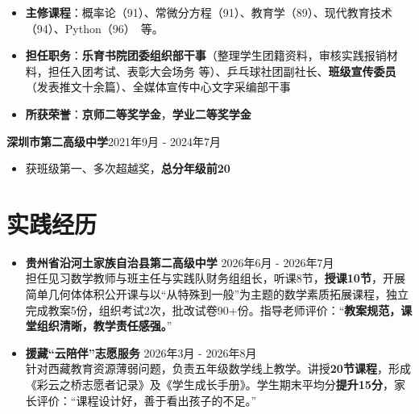 	\begin{itemize}
		
		\item \textbf{主修课程}：概率论（91）、常微分方程（91）、教育学（89）、现代教育技术（94）、Python（96）\ 等。
		\item \textbf{担任职务}：\textbf{乐育书院团委组织部干事}（整理学生团籍资料，审核实践报销材料，担任入团考试、表彰大会场务 等）、乒乓球社团副社长、\textbf{班级宣传委员}（发表推文十余篇）、全媒体宣传中心文字采编部干事
		\item \textbf{所获荣誉}：\textbf{京师二等奖学金}，\textbf{学业二等奖学金}
	\end{itemize}
	
	\vspace{0.5em}
	{\large \textbf{深圳市第二高级中学}}\hfill 2021年9月 - 2024年7月
	
	\begin{itemize}
	\item 获班级第一、多次超越奖，\textbf{总分年级前20}%
	\end{itemize}
	
	\vspace{-8pt}
	\section{\makebox[\widthof{\faGraduationCap}][c]{\color{WHU_Blue}{\faUniversity}}\quad 实践经历}
	\begin{itemize}
		\item \textbf{贵州省沿河土家族自治县第二高级中学} \hfill 2026年6月 - 2026年7月 \\
		担任见习数学教师与班主任与实践队财务组组长，听课8节，\textbf{授课10节}，开展简单几何体体积公开课与以“从特殊到一般”为主题的数学素质拓展课程，独立完成教案5份，组织考试2次，批改试卷90+份。指导老师评价：“\textbf{教案规范，课堂组织清晰，教学责任感强。}”
		
		
		\item \textbf{援藏“云陪伴”志愿服务} \hfill 2026年3月 - 2026年8月 \\
		针对西藏教育资源薄弱问题，负责五年级数学线上教学。讲授\textbf{20节课程}，形成《彩云之桥志愿者记录》及《学生成长手册》。学生期末平均分\textbf{提升15分}，家长评价：“课程设计好，善于看出孩子的不足。”
		
	\end{itemize}
	

